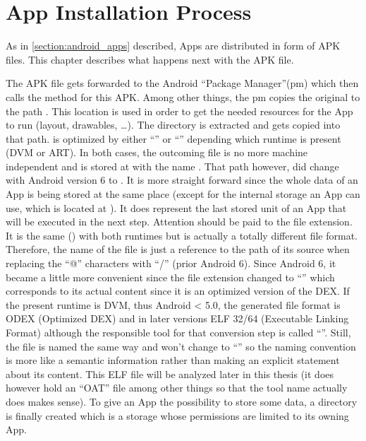 \section{App Installation Process}\label{section:app_installation}
As in \autoref{section:android_apps} described, Apps are distributed
in form of APK files. This chapter describes what happens next with
the APK file.

The APK file gets forwarded to the Android ``Package Manager''(pm)
which then calls the  method for this
APK. Among other things, the pm copies the original 
to the path .
This location is used in order to get the
needed resources for the App to run (layout, drawables, \ldots).
The  directory is extracted and gets copied
into that path.  is optimized by either ``''
or ``'' depending which runtime is present (DVM or ART).
In both cases, the outcoming file is no more machine independent
and is stored at  with the name
.
That path however, did change with Android version 6 to
. It
is more straight forward since the whole data of an App is being
stored at the same place (except for the internal storage an App can
use, which is located at ).
It does represent the last stored unit of an App that will be executed in the next step.
Attention should be paid to the file extension.
It is the same () with both runtimes but is actually a totally
different file format.
Therefore, the name of the file is just a reference to the path
of its source when replacing the ``@'' characters with ``/'' (prior Android 6).
Since Android 6, it became a little more convenient since the file extension changed to ``'' which corresponds to its actual content since it is
an optimized version of the DEX.
If the present runtime is DVM, thus Android < 5.0, the generated
file format is ODEX (Optimized DEX) and in later versions
ELF 32/64 (Executable Linking Format) although the responsible
tool for that conversion step is called ``''. Still, the file
is named the same way and won't change to ``'' so the naming
convention is more like a semantic information rather than making an
explicit statement about its content.
This ELF file will be analyzed later in this thesis
(it does however hold an ``OAT'' file among other things so that
the tool name actually does makes sense).
To give an App the possibility to
store some data, a  directory is
finally created which is a storage whose permissions are limited to its owning
App.

